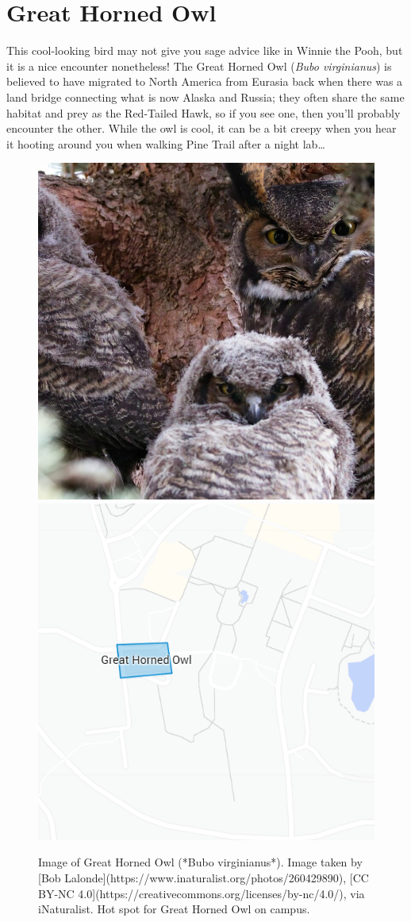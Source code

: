 \documentclass[
]{book}
\begin{document}
\hypertarget{great-horned-owl}{%
\section{Great Horned Owl}\label{great-horned-owl}}

This cool-looking bird may not give you sage advice like in Winnie the Pooh, but it is a nice encounter nonetheless! The Great Horned Owl (\emph{Bubo virginianus}) is believed to have migrated to North America from Eurasia back when there was a land bridge connecting what is now Alaska and Russia; they often share the same habitat and prey as the Red-Tailed Hawk, so if you see one, then you'll probably encounter the other. While the owl is cool, it can be a bit creepy when you hear it hooting around you when walking Pine Trail after a night lab\ldots{}

\begin{figure}

{\centering \includegraphics[width=0.49\linewidth,height=0.2\textheight]{animal_images/owl_11} \includegraphics[width=0.49\linewidth,height=0.2\textheight]{animal_images/owl_hotspot_11} 

}

\caption{Image of Great Horned Owl (*Bubo virginianus*). Image taken by [Bob Lalonde](https://www.inaturalist.org/photos/260429890), [CC BY-NC 4.0](https://creativecommons.org/licenses/by-nc/4.0/), via iNaturalist. Hot spot for Great Horned Owl on campus.}\label{fig:unnamed-chunk-2}
\end{figure}
\end{document}

